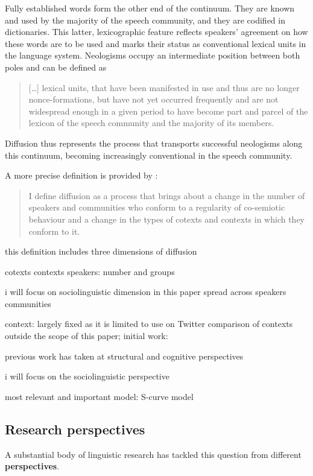 \documentclass[
  a4paper,
  abstract=on,
  captions=tableabove
  ]{scrartcl}
\renewcommand{\hw}[1]{\textbf{#1}}
\begin{document}
Fully established words form the other end of the continuum. They are known and used by the majority of the speech community, and they are codified in dictionaries. This latter, lexicographic feature reflects speakers' agreement on how these words are to be used and marks their status as conventional lexical units in the language system. Neologisms occupy an intermediate position between both poles and can be defined as

\blockquote[{\cite[31]{Kerremans2015WebNew}}]{
[\dots] lexical units, that have been manifested in use and thus are no longer nonce-formations, but have not yet occurred frequently and are not widespread enough in a given period to have become part and parcel of the lexicon of the speech community and the majority of its members.
}

Diffusion thus represents the process that transports successful neologisms along this continuum, becoming increasingly conventional in the speech community.

A more precise definition is provided by \citeauthor{Schmid2020DynamicsLinguistic}: \blockquote[\cite{Schmid2020DynamicsLinguistic}]{I define diffusion as a process that brings about a change in the number of speakers and communities who conform to a regularity of co-semiotic behaviour and a change in the types of cotexts and contexts in which they conform to it.} 

this definition includes three dimensions of diffusion

  cotexts
  contexts
  speakers: number and groups

i will focus on sociolinguistic dimension in this paper
  spread across
    speakers
    communities

context: largely fixed as it is limited to use on Twitter
  comparison of contexts outside the scope of this paper; initial work: \parencite{Wurschinger2016UsingWeb}

previous work has taken at
  structural and
  cognitive perspectives

i will focus on the sociolinguistic perspective


most relevant and important model: S-curve model

  \subsection{Research perspectives}
    \label{subsec:research-perspectives}

  A substantial body of linguistic research has tackled this question from different \hw{perspectives}. \parencite[16]{Schmid2016EnglishMorphology}
\end{document}
